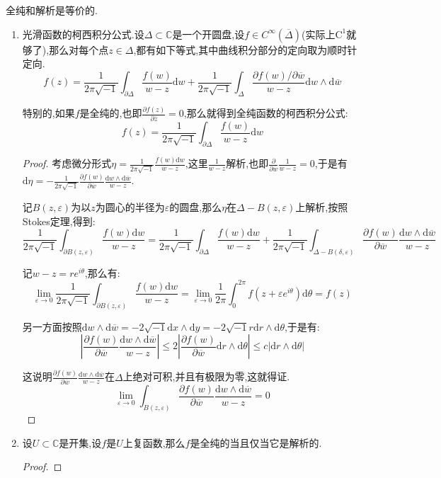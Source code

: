 全纯和解析是等价的.
\begin{enumerate}
	\item 光滑函数的柯西积分公式.设$\Delta\subset\mathbb{C}$是一个开圆盘,设$f\in C^{\infty}(\overline{\Delta})$(实际上$\mathrm{C}^1$就够了),那么对每个点$z\in\Delta$,都有如下等式,其中曲线积分部分的定向取为顺时针定向.
	$$f(z)=\frac{1}{2\pi\sqrt{-1}}\int_{\partial\Delta}\frac{f(w)}{w-z}\mathrm{d}w+\frac{1}{2\pi\sqrt{-1}}\int_{\Delta}\frac{\partial f(w)/\partial\overline{w}}{w-z}\mathrm{d}w\wedge\mathrm{d}\overline{w}$$
	
	特别的,如果$f$是全纯的,也即$\frac{\partial f(z)}{\partial\overline{z}}=0$,那么就得到全纯函数的柯西积分公式:
	$$f(z)=\frac{1}{2\pi\sqrt{-1}}\int_{\partial\Delta}\frac{f(w)}{w-z}\mathrm{d}w$$
	\begin{proof}
		
		考虑微分形式$\eta=\frac{1}{2\pi\sqrt{-1}}\frac{f(w)\mathrm{d}w}{w-z}$,这里$\frac{1}{w-z}$解析,也即$\frac{\partial}{\partial\overline{w}}\frac{1}{w-z}=0$,于是有$\mathrm{d}\eta=-\frac{1}{2\pi\sqrt{-1}}\frac{\partial f(w)}{\partial\overline{w}}\frac{\mathrm{d}w\wedge\mathrm{d}\overline{w}}{w-z}$.
		
		记$B(z,\varepsilon)$为以$z$为圆心的半径为$\varepsilon$的圆盘,那么$\eta$在$\Delta-B(z,\varepsilon)$上解析,按照Stokes定理,得到:
		$$\frac{1}{2\pi\sqrt{-1}}\int_{\partial B(z,\varepsilon)}\frac{f(w)\mathrm{d}w}{w-z}=\frac{1}{2\pi\sqrt{-1}}\int_{\partial\Delta}\frac{f(w)\mathrm{d}w}{w-z}+\frac{1}{2\pi\sqrt{-1}}\int_{\Delta-B(\delta,\varepsilon)}\frac{\partial f(w)}{\partial\overline{w}}\frac{\mathrm{d}w\wedge\mathrm{d}\overline{w}}{w-z}$$
		
		记$w-z=re^{i\theta}$,那么有:
		$$\lim_{\varepsilon\to0}\frac{1}{2\pi\sqrt{-1}}\int_{\partial B(z,\varepsilon)}\frac{f(w)\mathrm{d}w}{w-z}=\lim_{\varepsilon\to0}\frac{1}{2\pi}\int_0^{2\pi}f(z+\varepsilon e^{i\theta})\mathrm{d}\theta=f(z)$$
		
		另一方面按照$\mathrm{d}w\wedge\mathrm{d}\overline{w}=-2\sqrt{-1}\mathrm{d}x\wedge\mathrm{d}y=-2\sqrt{-1}r\mathrm{d}r\wedge\mathrm{d}\theta$,于是有:
		$$\left|\frac{\partial f(w)}{\partial\overline{w}}\frac{\mathrm{d}w\wedge\mathrm{d}\overline{w}}{w-z}\right|\le2\left|\frac{\partial f(w)}{\partial\overline{w}}\mathrm{d}r\wedge\mathrm{d}\theta\right|\le c|\mathrm{d}r\wedge\mathrm{d}\theta|$$
		
		这说明$\frac{\partial f(w)}{\partial\overline{w}}\frac{\mathrm{d}w\wedge\mathrm{d}\overline{w}}{w-z}$在$\Delta$上绝对可积,并且有极限为零,这就得证.
		$$\lim_{\varepsilon\to0}\int_{B(z,\varepsilon)}\frac{\partial f(w)}{\partial\overline{w}}\frac{\mathrm{d}w\wedge\mathrm{d}\overline{w}}{w-z}=0$$
	\end{proof}
    \item 设$U\subset\mathbb{C}$是开集,设$f$是$U$上复函数,那么$f$是全纯的当且仅当它是解析的.
    \begin{proof}
    	

\end{proof}
\end{enumerate}
